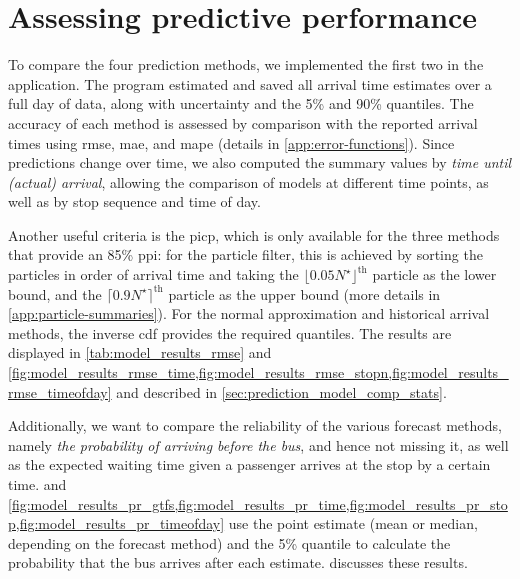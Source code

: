 \section{Assessing predictive performance}
\label{sec:prediction_model_comparison}

To compare the four prediction methods, we implemented the first two in the  application. The program estimated and saved all arrival time estimates over a full day of data, along with uncertainty and the 5\% and 90\% quantiles. The accuracy of each method is assessed by comparison with the reported arrival times using \gls{rmse}, \gls{mae}, and \gls{mape} (details in \cref{app:error-functions}). Since predictions change over time, we also computed the summary values by \emph{time until (actual) arrival}, allowing the comparison of models at different time points, as well as by stop sequence and time of day.


Another useful criteria is the \gls{picp}, which is only available for the three methods that provide an 85\% \gls{ppi}: for the particle filter, this is achieved by sorting the particles in order of arrival time and taking the $\lfloor 0.05 N^\star\rfloor^{\text{th}}$ particle as the lower bound, and the $\lceil 0.9 N^\star\rceil^{\text{th}}$ particle as the upper bound (more details in \cref{app:particle-summaries}). For the normal approximation and historical arrival methods, the inverse \gls{cdf} provides the required quantiles. The results are displayed in \cref{tab:model_results_rmse} and \cref{fig:model_results_rmse_time,fig:model_results_rmse_stopn,fig:model_results_rmse_timeofday} and described in \cref{sec:prediction_model_comp_stats}.


Additionally, we want to compare the reliability of the various forecast methods, namely \emph{the probability of arriving before the bus}, and hence not missing it, as well as the expected waiting time given a passenger arrives at the stop by a certain time.  and \cref{fig:model_results_pr_gtfs,fig:model_results_pr_time,fig:model_results_pr_stop,fig:model_results_pr_timeofday} use the point estimate (mean or median, depending on the forecast method) and the 5\% quantile to calculate the probability that the bus arrives after each estimate.  discusses these results.






